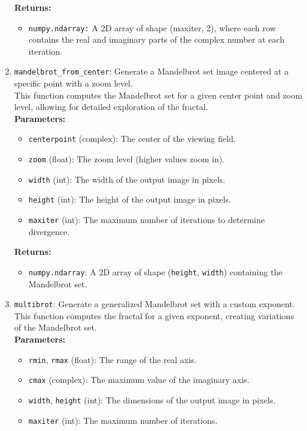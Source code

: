 \documentclass{article}
\begin{document}
\begin{enumerate}
    \textbf{Returns:}
    \begin{itemize}
        \item \texttt{numpy.ndarray:} A 2D array of shape (maxiter, 2), where each row contains the real and imaginary 
        parts of the complex number at each iteration.
    \end{itemize}
    \item \texttt{mandelbrot\_from\_center}: Generate a Mandelbrot set image centered at a specific point with a zoom level.\\
    This function computes the Mandelbrot set for a given center point and zoom level, allowing for detailed exploration of the fractal.\\
    \textbf{Parameters:}
    \begin{itemize}
        \item \texttt{centerpoint} (complex): The center of the viewing field.
        \item \texttt{zoom} (float): The zoom level (higher values zoom in).
        \item \texttt{width} (int): The width of the output image in pixels.
        \item \texttt{height} (int): The height of the output image in pixels.
        \item \texttt{maxiter} (int): The maximum number of iterations to determine divergence.
    \end{itemize}
    \textbf{Returns:}
    \begin{itemize}
        \item \texttt{numpy.ndarray}: A 2D array of shape (\texttt{height}, \texttt{width}) containing the Mandelbrot set.
    \end{itemize}
    \item \texttt{multibrot}: Generate a generalized Mandelbrot set with a custom exponent.\\
    This function computes the fractal for a given exponent, creating variations of the Mandelbrot set.\\
    \textbf{Parameters:}
    \begin{itemize}
        \item \texttt{rmin}, \texttt{rmax} (float): The range of the real axis.
        \item \texttt{cmax} (complex): The maximum value of the imaginary axis.
        \item \texttt{width}, \texttt{height} (int): The dimensions of the output image in pixels.
        \item \texttt{maxiter} (int): The maximum number of iterations.

\end{itemize}
\end{enumerate}
\end{document}
